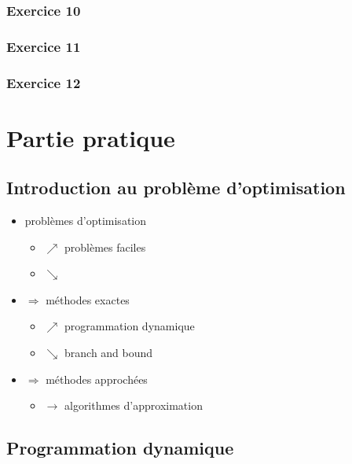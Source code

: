 \documentclass[a4paper, 12pt]{article}
\begin{document}
\subsubsection*{Exercice 10}


\subsubsection*{Exercice 11}


\subsubsection*{Exercice 12}


\pagebreak

\section{Partie pratique}

\subsection{Introduction au problème d'optimisation}

\begin{itemize}
  \item problèmes d'optimisation 
    \begin{itemize}
    \item[] $\nearrow$ problèmes faciles
    \item[] $\searrow$ 
    \end{itemize}
  \item  $\Rightarrow$ méthodes exactes 
    \begin{itemize}
    \item[] $\nearrow$ programmation dynamique
    \item[] $\searrow$ branch and bound
    \end{itemize}
  \item  $\Rightarrow$ méthodes approchées
    \begin{itemize}
    \item[] $\longrightarrow$ algorithmes d'approximation
    \end{itemize}
\end{itemize}
    
\subsection{Programmation dynamique}
\end{document}
